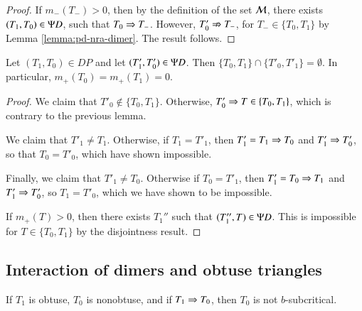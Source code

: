 \begin{proof}  
  If $m_-(T_-)>0$, then by the definition of the set $\mathcal M$, there
  exists $(T_1,T_0)\in \Psi D$, such that $T_0\Rightarrow T_-$.  However,
  $T'_0\nRightarrow T_-$, for $T_-\in\{T_0,T_1\}$ by Lemma
  \ref{lemma:pd-nra-dimer}.  The result follows.
\end{proof}

\begin{lemma}  
  Let $(T_1,T_0)\in DP$ and let $(T'_1,T'_0)\in\Psi D$.  Then
  $\{T_0,T_1\}\cap \{T'_0,T'_1\} = \emptyset$.  In particular,
  $m_+(T_0) = m_+(T_1)=0$.
\end{lemma}

\begin{proof}
  We claim that $T'_0\not\in \{T_0,T_1\}$.  Otherwise, $T'_0\Rightarrow
  T\in\{T_0,T_1\}$, which is contrary to the previous lemma.

  We claim that $T'_1\ne T_1$.  Otherwise, if $T_1=T'_1$, then
  $T'_1=T_1\Rightarrow T_0$ and $T'_1\Rightarrow T'_0$, so that $T_0 = T'_0$, which
  have shown impossible.

Finally, we claim that $T'_1\ne T_0$.  Otherwise if $T_0 = T'_1$, then
$T'_1 = T_0\Rightarrow T_1$ and $T'_1\Rightarrow T'_0$, so $T_1 = T'_0$, which we have
shown to be impossible.

If $m_+(T) >0$, then there exists $T_1''$ such that $(T_1'',T)\in
\Psi D$.  This is impossible for $T\in\{T_0,T_1\}$ by the disjointness
result.
\end{proof}


\subsection{Interaction of dimers and obtuse triangles}

\begin{lemma}
  If $T_1$ is obtuse, $T_0$ is nonobtuse, and if $T_1 \Rightarrow T_0$, then
  $T_0$ is not $b$-subcritical.
\end{lemma}


